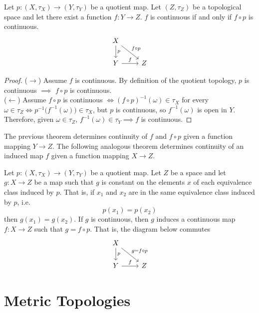 \documentclass{article}
\begin{document}
    \begin{theorem}
    Let $p: (X, \tau_X) \longrightarrow (Y, \tau_Y)$ be a quotient map. Let $(Z, \tau_Z)$ be a topological space and let there exist a function $f: Y \longrightarrow Z$. $f$ is continuous if and only if $f \circ p$ is continuous. 
    \[\begin{tikzcd}
        X \arrow{d}{p} \arrow{rd}{f \circ p}\\
        Y \arrow{r}{f} & Z
    \end{tikzcd}\]
    \end{theorem}
    \begin{proof}
    ($\rightarrow$) Assume $f$ is continuous. By definition of the quotient topology, $p$ is continuous $\implies$ $f \circ p$ is continuous. \\
    ($\leftarrow$) Assume $f \circ p$ is continuous $\iff (f \circ p)^{-1} (\omega) \in \tau_X$ for every $\omega \in \tau_Z \iff p^{-1} \big( f^{-1}(\omega) \big) \in \tau_X$, but $p$ is continuous, so $f^{-1}(\omega)$ is open in $Y$. Therefore, given $\omega \in \tau_{Z}$, $f^{-1} (\omega) \in \tau_Y \implies f$ is continuous. 
    \end{proof}

    The previous theorem determines continuity of $f$ and $f \circ p$ given a function mapping $Y \longrightarrow Z$. The following analogous theorem determines continuity of an induced map $f$ given a function mapping $X \longrightarrow Z$. 

    \begin{theorem}
    Let $p: (X, \tau_X )\longrightarrow (Y, \tau_Y)$ be a quotient map. Let $Z$ be a space and let $g: X \longrightarrow Z$ be a map such that $g$ is constant on the elements $x$ of each equivalence class induced by $p$. That is, if $x_1$ and $x_2$ are in the same equivalence class induced by $p$, i.e. 
    \[p(x_1) = p(x_2)\]
    then $g(x_1) = g(x_2)$. If $g$ is continuous, then $g$ induces a continuous map $f: X \longrightarrow Z$ such that $g = f \circ p$. That is, 
    the diagram below commutes 
    \[\begin{tikzcd}
        X \arrow{d}{p} \arrow{rd}{g=f \circ p}\\
        Y \arrow{r}{f} & Z
    \end{tikzcd}\]
    \end{theorem}

\section{Metric Topologies}
\end{document}
